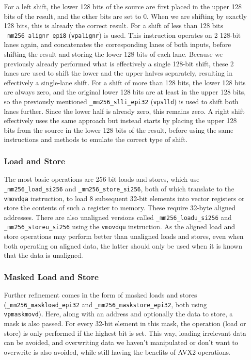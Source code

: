 \documentclass[12pt,dvipsnames]{article}
\newcommand{\icpp}[1]{\texttt{#1}}
\newcommand{\mono}[1]{\texttt{#1}}
\begin{document}
For a left shift, the lower 128 bits of the source are first placed in the upper 128 bits of the result, and the other bits are set to 0. When we are shifting by exactly 128 bits, this is already the correct result. For a shift of less than 128 bits \icpp{_mm256_alignr_epi8} (\mono{vpalignr}) is used. This instruction operates on 2 128-bit lanes again, and concatenates the corresponding lanes of both inputs, before shifting the result and storing the lower 128 bits of each lane. Because we previously already performed what is effectively a single 128-bit shift, these 2 lanes are used to shift the lower and the upper halves separately, resulting in effectively a single-lane shift. For a shift of more than 128 bits, the lower 128 bits are always zero, and the original lower 128 bits are at least in the upper 128 bits, so the previously mentioned \icpp{_mm256_slli_epi32} (\mono{vpslld}) is used to shift both lanes further. Since the lower half is already zero, this remains zero. A right shift effectively uses the same approach but instead starts by placing the upper 128 bits from the source in the lower 128 bits of the result, before using the same instructions and methods to emulate the correct type of shift.

\subsubsection*{Load and Store}
The most basic operations are 256-bit loads and stores, which use \icpp{_mm256_load_si256} and \icpp{_mm256_store_si256}, both of which translate to the \mono{vmovdqa} instruction, to load 8 subsequent 32-bit elements into vector registers or store the contents of such a register to memory. These require 32-byte aligned addresses. There are also unaligned versions called \icpp{_mm256_loadu_si256} and \icpp{_mm256_storeu_si256} using the \mono{vmovdqu} instruction. As the aligned load and store operations may perform better than unaligned loads and stores, even when both operating on aligned data, the latter should only be used when it is known that the data is unaligned.

\subsubsection*{Masked Load and Store}
Further refinement comes in the form of masked loads and stores (\icpp{_mm256_maskload_epi32} and \icpp{_mm256_maskstore_epi32}, both using \mono{vpmaskmovd}). Here, along with an address and optionally the data to store, a mask is also passed. For every 32-bit element in this mask, the operation (load or store) is only performed if the highest bit is set. This way, loading irrelevant data can be avoided, and overwriting data we haven't manipulated or don't want to overwrite is also avoided, while still having the benefits of AVX2 operations.
\end{document}
